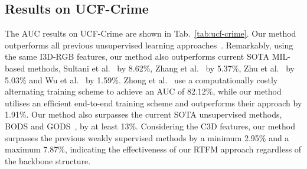 \documentclass[final]{cvpr}
\begin{document}
\subsection{Results on UCF-Crime}

The AUC results on UCF-Crime are shown in Tab.~\ref{tab:ucf-crime}. Our method outperforms all previous unsupervised learning approaches~\cite{hasan2016learning,sohrab2018subspace,luo2017revisit,wang2019gods}. Remarkably, using the same I3D-RGB features, our method also  outperforms current SOTA MIL-based methods, Sultani et al.~\cite{sultani2018real} by 8.62\%, Zhang et al.~\cite{8803657} by 5.37\%, Zhu et al.~\cite{zhu2019motion} by 5.03\% and Wu et al.~\cite{Wu2020not} by 1.59\%.  Zhong et al.~\cite{zhong2019graph} use a computationally costly alternating training scheme
to achieve an AUC of 82.12\%, while our method utilises an efficient end-to-end training scheme
and outperforms their approach by 1.91\%. Our method also surpasses the current SOTA unsupervised methods, BODS and GODS~\cite{wang2019gods}, by at least 13\%. 
Considering the C3D features, our method surpasses the previous weakly supervised methods by a minimum 2.95\% and a maximum 7.87\%, indicating the effectiveness of our RTFM approach regardless of the backbone structure.  
\end{document}
